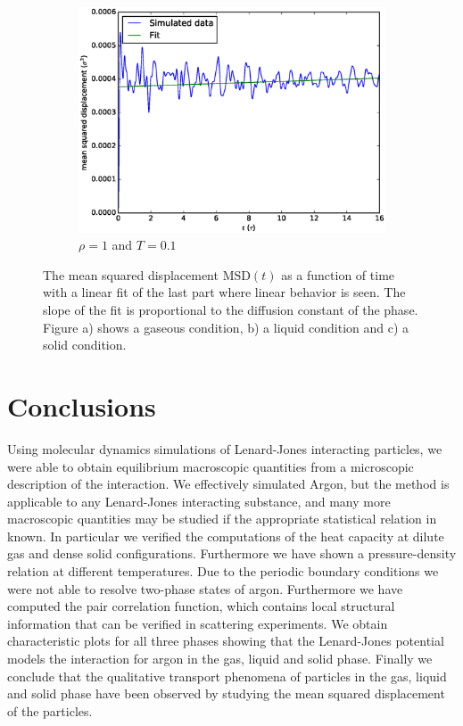 \documentclass[twoside]{article}
\begin{document}
\begin{figure}[h]
\begin{subfigure}[b]{0.48\textwidth}
		\includegraphics[width=0.9\linewidth]{fig/figure_msd_solid.eps}
		\caption{$\rho = 1$ and $T = 0.1$}
		\label{fig:figure_msd_solid}
	\end{subfigure}
	\caption{The mean squared displacement $\mathrm{MSD}(t)$ as a function of time with a linear fit of the last part where linear behavior is seen. The slope of the fit is proportional to the diffusion constant of the phase. Figure a) shows a gaseous condition, b) a liquid condition and c) a solid condition.}
	\label{fig:figure_msd}
\end{figure}



	
\section{Conclusions}
Using molecular dynamics simulations of Lenard-Jones interacting particles, we were able to obtain equilibrium macroscopic quantities from a microscopic description of the interaction. We effectively simulated Argon, but the method is applicable to any Lenard-Jones interacting substance, and many more macroscopic quantities may be studied if the appropriate statistical relation in known. In particular we verified the computations of the heat capacity at dilute gas and dense solid configurations. Furthermore we have shown a pressure-density relation at different temperatures. Due to the periodic boundary conditions we were not able to resolve two-phase states of argon. Furthermore we have computed the pair correlation function, which contains local structural information that can be verified in scattering experiments. We obtain characteristic plots for all three phases showing that the Lenard-Jones potential models the interaction for argon in the gas, liquid and solid phase. Finally we conclude that the qualitative transport phenomena of particles in the gas, liquid and solid phase have been observed by studying the mean squared displacement of the particles.
\end{document}
